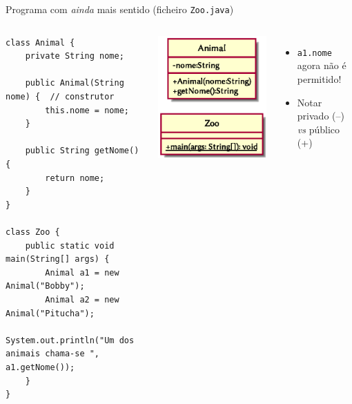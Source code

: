 \documentclass[portuguese, aspectratio=169, xcolor=table]{beamer}
\begin{document}
\begin{frame}[fragile]{Programa com \textit{ainda} mais sentido (ficheiro \texttt{Zoo.java})}
\begin{columns}
\begin{verbatim}
class Animal {
    private String nome;
    
    public Animal(String nome) {  // construtor
        this.nome = nome;
    }
    
    public String getNome() {
        return nome;
    }
}

class Zoo {
    public static void main(String[] args) {
        Animal a1 = new Animal("Bobby");
        Animal a2 = new Animal("Pitucha");
        System.out.println("Um dos animais chama-se ", a1.getNome());
    }
}
\end{verbatim}
\begin{center}
\includegraphics[width=0.4\linewidth]{./uml_diagrams/class4}
\end{center}
\begin{itemize}
    \item \texttt{a1.nome} agora não é permitido!
    \item Notar privado (--) \textit{vs} público (+)
\end{itemize}
\end{columns}
\end{frame}  
\end{document}
